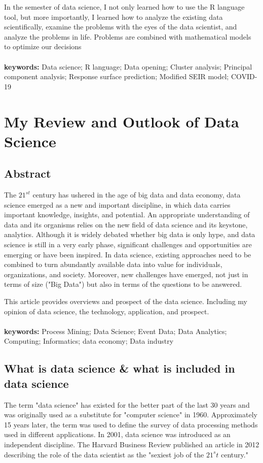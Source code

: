 \documentclass[a4paper, 11pt,twoside=true]{scrartcl}
\begin{document}
\quad  In the semester of data science, I not only learned how to use the R language tool, but more importantly, I learned how to analyze the existing data scientifically, examine the problems with the eyes of the data scientist, and analyze the problems in life. Problems are combined with mathematical models to optimize our decisions\\
\\
\textbf{keywords:} Data science; R language; Data opening; Cluster analysis; Principal component analysis; Response surface prediction; Modified SEIR model; COVID-19

\newpage
{}
\setcounter{page}{1}
\tableofcontents
\newpage
{}
\restoregeometry

\section{My Review and Outlook of Data Science}
\subsection*{Abstract}
\qquad The $21^{st}$ century has ushered in the age of big data and data economy, data science emerged as a new and important discipline, in which data carries important knowledge, insights, and potential. An appropriate understanding of data and its organisms relies on the new field of data science and its keystone, analytics. Although it is widely debated whether big data is only hype, and data science is still in a very early phase, significant challenges and opportunities are emerging or have been inspired.  In data science, existing approaches need to be combined to turn abundantly available data into value for individuals, organizations, and society. Moreover, new challenges have emerged, not just in terms of size ("Big Data") but also in terms of the questions to be answered. 

\quad This article provides overviews and prospect of the  data science.  Including my opinion of data science, the technology, application, and prospect.\\
\\
\textbf{keywords:} Process Mining; Data Science; Event Data; Data Analytics; Computing; Informatics; data economy; Data industry 

\subsection{What is data science \& what is included in data science}
\qquad The term "data science" has existed for the better part of the last 30 years and was originally used as a substitute for "computer science" in 1960. Approximately 15 years later, the term was used to define the survey of data processing methods used in different applications. In 2001, data science was introduced as an independent discipline. The Harvard Business Review published an article in 2012 describing the role of the data scientist as the "sexiest job of the $21^st$ century."
\end{document}
